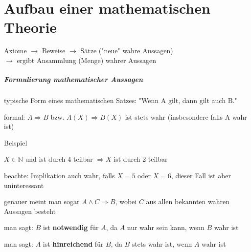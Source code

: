 \chapter{Aufbau einer mathematischen Theorie}
Axiome $\to$ Beweise $\to$ Sätze ("neue" wahre Aussagen) \\
$\to$ ergibt Ansammlung (Menge) wahrer Aussagen

\paragraph*{Formulierung mathematischer Aussagen}
\begin{compactitem}
	\item typische Form eines mathematischen Satzes: "Wenn A gilt, dann gilt auch B."
	\item formal: $A \Rightarrow B$ bzw. $A(X) \Rightarrow B(X)$ ist stets wahr (insbesondere falls 
	A wahr ist)
\end{compactitem}

Beispiel
\begin{compactitem}
	\item $X \in \mathbb N$ und ist durch 4 teilbar $\Rightarrow X$ ist durch 2 teilbar
	\item beachte: Implikation auch wahr, falls $X = 5$ oder $X =6$, dieser Fall ist aber 
	uninteressant
	\item genauer meint man sogar $A \land C \Rightarrow B$, wobei $C$ aus allen bekannten wahren
	Aussagen besteht
	\item man sagt: $B$ ist \textbf{notwendig} f\"ur $A$, da $A$ nur wahr sein kann, wenn $B$ 
	wahr ist
	\item man sagt: $A$ ist \textbf{hinreichend} f\"ur $B$, da $B$ stets wahr ist, wenn $A$ wahr ist 
\end{compactitem}


